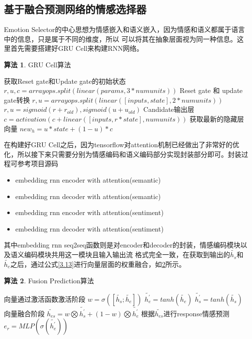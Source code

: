 \documentclass[supercite]{HustGraduPaper}
\theoremstyle{definition}
\newtheorem{alg}{算法}[section]
\begin{document}
\subsection{基于融合预测网络的情感选择器}
Emotion Selector的中心思想为情感嵌入和语义嵌入，因为情感和语义都属于语言中的信息，只是属于不同的维度，所以
可以将其在抽象层面视为同一种信息。这里首先需要搭建好GRU Cell来构建RNN网络。
\begin{shaded*}
  \begin{alg}{GRU Cell算法}
  \label{alg:gru}
  \begin{algorithmic}
    \State 获取Reset gate和Update gate的初始状态
    \State $r, u, c = arrayops.split(linear(params, 3 * numunits))$
    \State Reset gate 和 update gate转换
    \State $r, u = arrayops.split(linear([inputs, state], 2 * numunits))$
    \State $r, u = sigmoid(r+r_{old}), sigmoid(u+u_{old})$
    \State Candidate输出层
    \State $c = activation(c+linear([inputs, r * state], numunits))$
    \State 获取最新的隐藏层向量
    \State $new_h = u * state + (1 - u) * c$
  \end{algorithmic}
  \end{alg}
\end{shaded*}

在构建好GRU Cell之后，因为tensorflow对attention机制已经做出了非常好的优化，所以接下来只需要分别为情感编码和语义编码部分实现封装部分即可。封装过程可参考项目源码
\cite{ECMP}
\begin{itemize}
  \item embedding rnn encoder with attention(semantic)
  \item embedding rnn decoder with attention(semantic)
  \item embedding rnn encoder with attention(sentiment)
  \item embedding rnn decoder with attention(sentiment)
\end{itemize}

其中embedding rnn seq2seq函数则是对encoder和decoder的封装，情感编码模块以及语义编码模块共用这一模块且输入输出流
格式完全一致，在获取到输出的$\widetilde{h_s}$和$\widetilde{h_e}$之后，通过公式\ref{3.13}进行向量层面的权重融合，如\ref{alg:fusionprediction}所示。
\begin{shaded*}
  \begin{alg}{Fusion Prediction算法}
  \label{alg:fusionprediction}
  \begin{algorithmic}
      \State 向量通过激活函数激活阶段
      \State $w = \sigma([\widetilde{h_s};\widetilde{h_e}])$
      \State ${\widetilde{h_e^{'}}} = tanh(\widetilde{h_e})$
      \State ${\widetilde{h_s^{'}}} = tanh(\widetilde{h_s})$
      \State 向量融合阶段
      \State ${\widetilde{h_{es}}} = w \bigotimes {\widetilde{h_s^{'}}} + (1 - w) \bigotimes {\widetilde{h_e^{'}}}$
      \State 根据$\widetilde{h_{es}}$进行response情感预测
      \State $e_r = MLP(\sigma(\widetilde{h_e^{'}}))$
    \EndProcedure
  \end{algorithmic}
  \end{alg}
\end{shaded*}
\end{document}
